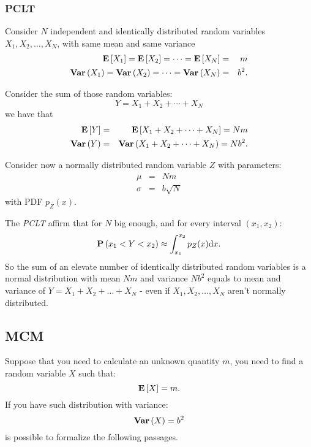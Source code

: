 \documentclass[dissertation.tex]{subfiles}
\begin{document}
\subsubsection{\acf{PCLT}}
Consider $N$ independent and identically distributed random variables
$X_1,X_2,\dots,X_N$, with same mean and same variance
\begin{eqnarray*}
  \mathrm{\textbf{E}}\left[X_1\right]=\mathrm{\textbf{E}}\left[X_2\right]=\dots=\mathrm{\textbf{E}}\left[X_N\right]&=&m\\
  \mathrm{\textbf{Var}}\left(X_1\right)=\mathrm{\textbf{Var}}\left(X_2\right)=\dots=\mathrm{\textbf{Var}}\left(X_N\right)&=&b^2.
\end{eqnarray*}

Consider the sum of those random variables:
\begin{equation*}
  Y = X_1+X_2+\cdots+X_N
\end{equation*}
we have that
\begin{eqnarray*}
  \mathrm{\textbf{E}}\left[Y\right]&=&\mathrm{\textbf{E}}\left[X_1+X_2+\cdots+X_N\right]=Nm\\
  \mathrm{\textbf{Var}}\left(Y\right)&=&\mathrm{\textbf{Var}}\left(X_1+X_2+\cdots+X_N\right)=Nb^2.
\end{eqnarray*}

Consider now a normally distributed random variable $Z$ with
parameters:
\begin{eqnarray*}
  \mu&=&Nm\\
  \sigma&=&b\sqrt{N}
\end{eqnarray*}
with \ac{PDF} $p_Z(x)$.

The \emph{\ac{PCLT}} affirm that for $N$ big
enough, and for every interval $(x_1,x_2)$:
\begin{equation}\label{eq:tcl}
  \mathrm{\textbf{P}}\left(x_1<Y<x_2\right)\approx\int_{x_1}^{x_2}p_Z(x) \mathrm{d} x.
\end{equation}
So the sum of an elevate number of identically distributed random
variables is a normal distribution with mean $Nm$ and variance $Nb^2$
equals to mean and variance of $Y=X_1+X_2+\dots+X_N$ - even if
$X_1,X_2,\dots,X_N$ aren't normally distributed.

\subsection{\acf{MCM}}
Suppose that you need to calculate an unknown quantity $m$, you need
to find a random variable $X$ such that:
\begin{equation*}
  \mathrm{\textbf{E}}\left[X\right] = m.
\end{equation*}
If you have such distribution with variance:
\begin{equation*}
  \mathrm{\textbf{Var}}\left(X\right) = b^2
\end{equation*}
is possible to formalize the following passages.
\end{document}
